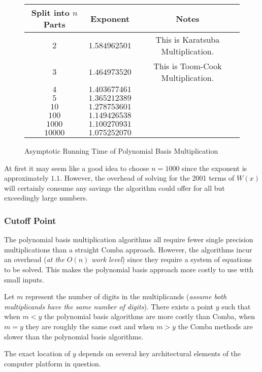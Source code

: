 \documentclass[b5paper]{book}
\begin{document}
\begin{figure}
\begin{center}
\begin{tabular}{|c|c|c|}
\hline \textbf{Split into $n$ Parts} & \textbf{Exponent}  & \textbf{Notes}\\
\hline $2$ & $1.584962501$ & This is Karatsuba Multiplication. \\
\hline $3$ & $1.464973520$ & This is Toom-Cook Multiplication. \\
\hline $4$ & $1.403677461$ &\\
\hline $5$ & $1.365212389$ &\\
\hline $10$ & $1.278753601$ &\\
\hline $100$ & $1.149426538$ &\\
\hline $1000$ & $1.100270931$ &\\
\hline $10000$ & $1.075252070$ &\\
\hline
\end{tabular}
\end{center}
\caption{Asymptotic Running Time of Polynomial Basis Multiplication}
\label{fig:exponent}
\end{figure}

At first it may seem like a good idea to choose $n = 1000$ since the exponent is approximately $1.1$.  However, the overhead
of solving for the 2001 terms of $W(x)$ will certainly consume any savings the algorithm could offer for all but exceedingly large
numbers.  

\subsubsection{Cutoff Point}
The polynomial basis multiplication algorithms all require fewer single precision multiplications than a straight Comba approach.  However, 
the algorithms incur an overhead (\textit{at the $O(n)$ work level}) since they require a system of equations to be solved.  This makes the
polynomial basis approach more costly to use with small inputs.

Let $m$ represent the number of digits in the multiplicands (\textit{assume both multiplicands have the same number of digits}).  There exists a 
point $y$ such that when $m < y$ the polynomial basis algorithms are more costly than Comba, when $m = y$ they are roughly the same cost and 
when $m > y$ the Comba methods are slower than the polynomial basis algorithms.  

The exact location of $y$ depends on several key architectural elements of the computer platform in question.
\end{document}
